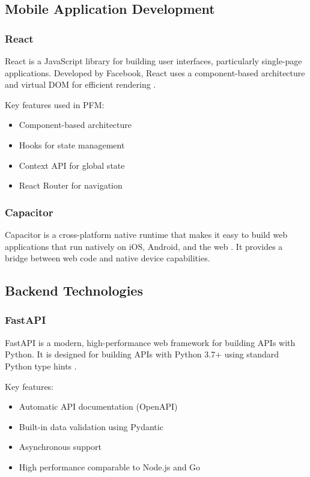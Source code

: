 \subsection{Mobile Application Development}

\subsubsection{React}

React is a JavaScript library for building user interfaces, particularly single-page applications. Developed by Facebook, React uses a component-based architecture and virtual DOM for efficient rendering \cite{react2024}.

Key features used in PFM:
\begin{itemize}
    \item Component-based architecture
    \item Hooks for state management
    \item Context API for global state
    \item React Router for navigation
\end{itemize}

\subsubsection{Capacitor}

Capacitor is a cross-platform native runtime that makes it easy to build web applications that run natively on iOS, Android, and the web \cite{capacitor2024}. It provides a bridge between web code and native device capabilities.

\subsection{Backend Technologies}

\subsubsection{FastAPI}

FastAPI is a modern, high-performance web framework for building APIs with Python. It is designed for building APIs with Python 3.7+ using standard Python type hints \cite{fastapi2024}.

Key features:
\begin{itemize}
    \item Automatic API documentation (OpenAPI)
    \item Built-in data validation using Pydantic
    \item Asynchronous support
    \item High performance comparable to Node.js and Go
\end{itemize}


